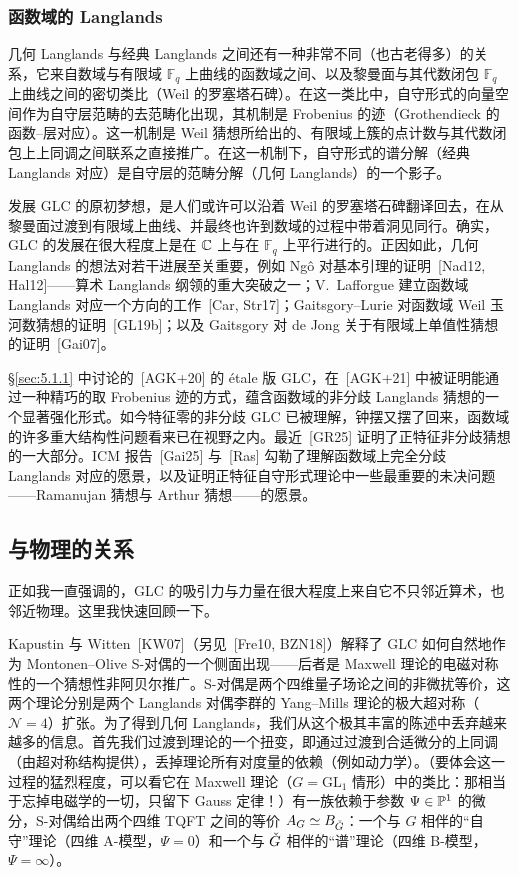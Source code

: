 \subsubsection{函数域的 Langlands}\label{sec:6.1.2}

几何 Langlands 与经典 Langlands 之间还有一种非常不同（也古老得多）的关系，它来自数域与有限域 $\mathbb{F}_{q}$ 上曲线的函数域之间、以及黎曼面与其代数闭包 $\mathbb{F}_{q}$ 上曲线之间的密切类比（Weil 的罗塞塔石碑）。在这一类比中，自守形式的向量空间作为自守层范畴的去范畴化出现，其机制是 Frobenius 的迹（Grothendieck 的函数–层对应）。这一机制是 Weil 猜想所给出的、有限域上簇的点计数与其代数闭包上上同调之间联系之直接推广。在这一机制下，自守形式的谱分解（经典 Langlands 对应）是自守层的范畴分解（几何 Langlands）的一个影子。

发展 GLC 的原初梦想，是人们或许可以沿着 Weil 的罗塞塔石碑翻译回去，在从黎曼面过渡到有限域上曲线、并最终也许到数域的过程中带着洞见同行。确实，GLC 的发展在很大程度上是在 $\mathbb{C}$ 上与在 $\mathbb{F}_{q}$ 上平行进行的。正因如此，几何 Langlands 的想法对若干进展至关重要，例如 Ngô 对基本引理的证明~[Nad12, Hal12]——算术 Langlands 纲领的重大突破之一；V.~Lafforgue 建立函数域 Langlands 对应一个方向的工作~[Car, Str17]；Gaitsgory–Lurie 对函数域 Weil 玉河数猜想的证明~[GL19b]；以及 Gaitsgory 对 de Jong 关于有限域上单值性猜想的证明~[Gai07]。

\S\ref{sec:5.1.1} 中讨论的~[AGK+20] 的 étale 版 GLC，在~[AGK+21] 中被证明能通过一种精巧的取 Frobenius 迹的方式，蕴含函数域的非分歧 Langlands 猜想的一个显著强化形式。如今特征零的非分歧 GLC 已被理解，钟摆又摆了回来，函数域的许多重大结构性问题看来已在视野之内。最近~[GR25] 证明了正特征非分歧猜想的一大部分。ICM 报告~[Gai25] 与~[Ras] 勾勒了理解函数域上完全分歧 Langlands 对应的愿景，以及证明正特征自守形式理论中一些最重要的未决问题——Ramanujan 猜想与 Arthur 猜想——的愿景。

\subsection{与物理的关系}\label{sec:6.2}

正如我一直强调的，GLC 的吸引力与力量在很大程度上来自它不只邻近算术，也邻近物理。这里我快速回顾一下。

Kapustin 与 Witten~[KW07]（另见~[Fre10, BZN18]）解释了 GLC 如何自然地作为 Montonen–Olive S-对偶的一个侧面出现——后者是 Maxwell 理论的电磁对称性的一个猜想性非阿贝尔推广。S-对偶是两个四维量子场论之间的非微扰等价，这两个理论分别是两个 Langlands 对偶李群的 Yang–Mills 理论的极大超对称（$\mathcal{N}=4$）扩张。为了得到几何 Langlands，我们从这个极其丰富的陈述中丢弃越来越多的信息。首先我们过渡到理论的一个扭变，即通过过渡到合适微分的上同调（由超对称结构提供），丢掉理论所有对度量的依赖（例如动力学）。（要体会这一过程的猛烈程度，可以看它在 Maxwell 理论（$G=\mathrm{GL}_{1}$ 情形）中的类比：那相当于忘掉电磁学的一切，只留下 Gauss 定律！）有一族依赖于参数 $\Psi\in\mathbb{P}^{1}$ 的微分，S-对偶给出两个四维 TQFT 之间的等价 $A_{G}\simeq B_{\check{G}}$：一个与 $G$ 相伴的“自守”理论（四维 A-模型，$\Psi=0$）和一个与 $\check{G}$ 相伴的“谱”理论（四维 B-模型，$\Psi=\infty$）。

